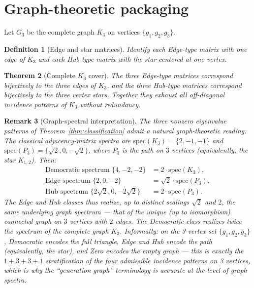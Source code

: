 \documentclass[12pt,a4paper]{article}
\newtheorem{theorem}{Theorem}[section]
\newtheorem{definition}[theorem]{Definition}
\newtheorem{remark}[theorem]{Remark}
\begin{document}
\section{Graph-theoretic packaging}\label{sec:graph}
Let $G_3$ be the complete graph $K_3$ on vertices $\{g_1,g_2,g_3\}$.

\begin{definition}[Edge and star matrices]
Identify each Edge-type matrix with one edge of $K_3$ and each Hub-type matrix with the star centered at one vertex.
\end{definition}

\begin{theorem}[Complete $K_3$ cover]\label{thm:k3}
The three Edge-type matrices correspond bijectively to the three edges of $K_3$, and the three Hub-type matrices correspond bijectively to the three vertex stars.
Together they exhaust all off-diagonal incidence patterns of $K_3$ without redundancy.
\end{theorem}

\begin{remark}[Graph-spectral interpretation]
\label{rem:graph-spectral}
The three nonzero eigenvalue patterns of Theorem~\ref{thm:classification} admit a natural graph-theoretic reading. The classical adjacency-matrix spectra are $\mathrm{spec}(K_3) = \{2, -1, -1\}$ and $\mathrm{spec}(P_3) = \{\sqrt{2}, 0, -\sqrt{2}\}$, where $P_3$ is the path on $3$ vertices (equivalently, the star $K_{1,2}$). Then:
\begin{align*}
  \text{Democratic spectrum } \{4, -2, -2\} &= 2 \cdot \mathrm{spec}(K_3), \\
  \text{Edge spectrum } \{2, 0, -2\} &= \sqrt{2} \cdot \mathrm{spec}(P_3), \\
  \text{Hub spectrum } \{2\sqrt{2}, 0, -2\sqrt{2}\} &= 2 \cdot \mathrm{spec}(P_3).
\end{align*}
The Edge and Hub classes thus realize, up to distinct scalings $\sqrt{2}$ and $2$, the same underlying graph spectrum --- that of the unique (up to isomorphism) connected graph on $3$ vertices with $2$ edges. The Democratic class realizes twice the spectrum of the complete graph $K_3$. Informally: on the 3-vertex set $\{g_1, g_2, g_3\}$, Democratic encodes the full triangle, Edge and Hub encode the path (equivalently, the star), and Zero encodes the empty graph --- this is exactly the $1+3+3+1$ stratification of the four admissible incidence patterns on 3 vertices, which is why the ``generation graph'' terminology is accurate at the level of graph spectra.
\end{remark}
\end{document}
